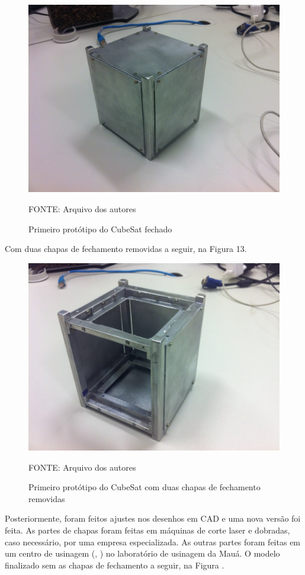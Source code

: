 \documentclass[
	12pt,				%
	openany,			%
	twoside,			%
	a4paper,			%
	english,			%
	french,				%
	spanish,			%
	brazil,				%
	oldfontcommands
	]{abntex2}
\begin{document}
\begin{figure}[th]
	\caption{Primeiro protótipo do CubeSat fechado}
	\centering
	\includegraphics[width=0.7\linewidth]{./figs/PrototypeOne_Full}
	
	\begin{small}
		FONTE: Arquivo dos autores
	\end{small}
	\label{fig:ProtooneF}
\end{figure}

Com duas chapas de fechamento removidas a seguir, na Figura 13.

\begin{figure}[th]
	\caption{Primeiro protótipo do CubeSat com duas chapas de fechamento removidas}
	\centering
	\includegraphics[width=0.7\linewidth]{./figs/PrototypeOne}
	
	\begin{small}
		FONTE: Arquivo dos autores
	\end{small}
	\label{fig:Protoone}
\end{figure}

Posteriormente, foram feitos ajustes nos desenhos em CAD e uma nova versão foi feita. As partes de chapas foram feitas em máquinas de corte laser e dobradas, caso necessário, por uma empresa especializada. As outras partes foram feitas em um centro de usinagem (, ) no laboratório de usinagem da Mauá. O modelo finalizado sem as chapas de fechamento a seguir, na Figura .
\end{document}
